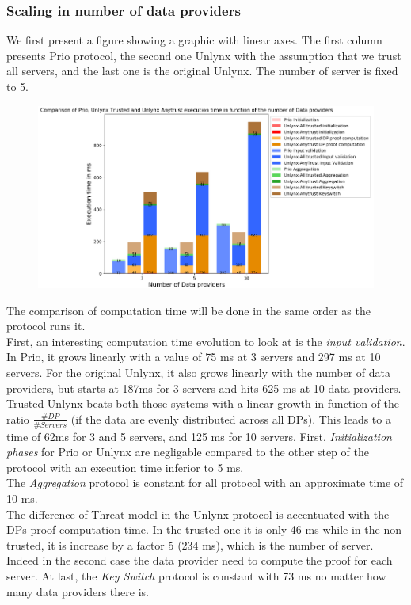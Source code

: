 \documentclass{article}
\begin{document}
\subsubsection{Scaling in number of data providers}
We first present a figure showing a graphic with linear axes. The first column presents Prio protocol, the second one Unlynx with the assumption that we trust all servers, and the last one is the original  Unlynx. The number of server is fixed to 5.
\begin{figure}[H]
\centering
\includegraphics[scale=0.7]{img/ComparisonlinearDP.png}
\end{figure}
The comparison of computation time will be done in the same order as the protocol runs it.\\
First, an interesting computation time evolution to look at is the \textit{input validation}. In Prio, it grows linearly with a value of 75 ms at 3 servers and 297 ms at 10 servers. For the original Unlynx, it also grows linearly with the number of data providers, but starts at 187ms for 3 servers and hits 625 ms at 10 data providers. Trusted Unlynx beats both those systems with a linear growth in function of the ratio $\frac{\#DP}{\#Servers}$ (if the data are evenly distributed across all DPs). This leads to a time of 62ms for 3 and 5 servers, and 125 ms for 10 servers.
First, \textit{Initialization phases} for Prio or Unlynx are negligable compared to the other step of the protocol with an execution time inferior to 5 ms.\\
The \textit{Aggregation} protocol is constant for all protocol with an approximate time of 10 ms.\\
The difference of Threat model in the Unlynx protocol is accentuated with the DPs proof computation time. In the trusted one it is only 46 ms while in the non trusted, it is increase by a factor 5 (234 ms), which is the number of server.\\
Indeed in the second case the data provider need to compute the proof for each server.
At last, the \textit{Key Switch} protocol is constant with 73 ms no matter how many data providers there is.\\
\end{document}
